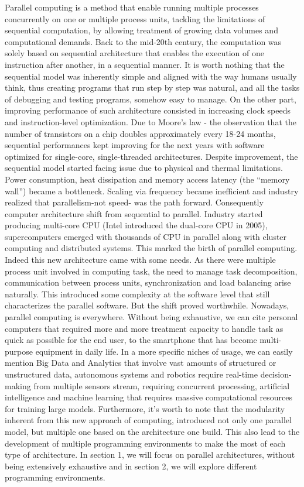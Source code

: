 Parallel computing is a method that enable  running multiple processes concurrently on one or multiple process units, tackling the limitations of sequential computation, by allowing treatment of growing data volumes and computational demands. Back to the mid-20th century, the computation was solely based on sequential architecture that enables the execution of one instruction after another, in a sequential manner. It is worth nothing that the sequential model was inherently simple and aligned with the way humans usually think, thus creating programs that run step by step was natural, and all the tasks of debugging and testing programs, somehow easy to manage. On the other part, improving performance of such architecture consisted in increasing clock speeds and instruction-level optimization. Due to Moore’s law - the observation that the number of transistors on a chip doubles approximately every 18-24 months, sequential performances kept improving for the next years with software optimized for single-core, single-threaded architectures. Despite improvement, the sequential model started facing issue due to physical and thermal limitations. Power consumption, heat dissipation and memory access latency (the “memory wall”) became a bottleneck. Scaling via frequency became inefficient and industry realized that parallelism-not speed- was the path forward. Consequently computer architecture shift from sequential to parallel. Industry started producing multi-core CPU (Intel introduced the dual-core CPU in 2005), supercomputers emerged with thousands of CPU in parallel along with cluster computing and distributed systems. This marked the birth of parallel computing. Indeed this new architecture came with some needs. As there were multiple process unit involved in computing task, the need to manage task decomposition, communication between process units, synchronization and load balancing arise naturally. This introduced some complexity at the software level that still characterizes the parallel software. But the shift proved worthwhile. Nowadays, parallel computing is everywhere. Without being exhaustive, we can cite personal computers that required more and more treatment capacity to handle task as quick as possible for the end user, to the smartphone that has become multi-purpose equipment in daily life. In a more specific niches of usage, we can easily mention Big Data and Analytics that involve vast amounts of structured or unstructured data, autonomous systems and robotics  require real-time decision-making from multiple sensors stream, requiring concurrent processing, artificial intelligence and machine learning that requires massive computational resources for training large models. Furthermore, it’s worth to note that the modularity inherent from this new approach of computing, introduced not only one parallel model, but multiple one based on the architecture one build. This also lead to the development of multiple programming environments to make the most of each type of architecture. In section 1, we will focus on parallel architectures, without being extensively exhaustive and in section 2, we will explore different programming environments.


